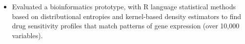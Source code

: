 \documentclass[10pt,a4paper]{altacv}
\begin{document}
\medskip




\begin{itemize}
  \item \small{Evaluated a bioinformatics prototype, with R language statistical methods based on distributional entropies and kernel-based density estimators to find drug sensitivity profiles that match patterns of gene expression (over 10,000 variables).}
\end{itemize}







\end{document}
